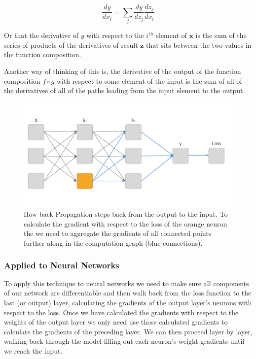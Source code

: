 \documentclass[]{book}
\theoremstyle{definition}
\theoremstyle{definition}
\theoremstyle{definition}
\theoremstyle{remark}
\begin{document}
\begin{equation} 
  \frac{dy}{dx_i} = \sum_{j}\frac{dy}{dz_j}\frac{dz_j}{dx_i}
  \label{eq:chainrulemv}
\end{equation}

Or that the derivative of \(y\) with respect to the \(i^{\text{th}}\)
element of \(\textbf{x}\) is the sum of the series of products of the
derivatives of result \(\textbf{z}\) that sits between the two values in
the function composition.

Another way of thinking of this is, the derivative of the output of the
function composition \(f \circ g\) with respect to some element of the
input is the sum of all of the derivatives of all of the paths leading
from the input element to the output.

\begin{figure}

{\centering \includegraphics{figures/backprop} 

}

\caption{How back Propagation steps back from the output to the input. To calculate the gradient with respect to the loss of the orange neuron the we need to aggregate the gradients of all connected points further along in the computation graph (blue connections).}\label{fig:unnamed-chunk-1}
\end{figure}

\subsubsection{Applied to Neural
Networks}\label{applied-to-neural-networks}

To apply this technique to neural networks we need to make sure all
components of our network are differentiable and then walk back from the
loss function to the last (or output) layer, calculating the gradients
of the output layer's neurons with respect to the loss. Once we have
calculated the gradients with respect to the weights of the output layer
we only need use those calculated gradients to calculate the gradients
of the preceding layer. We can then proceed layer by layer, walking back
through the model filling out each neuron's weight gradients until we
reach the input.
\end{document}

